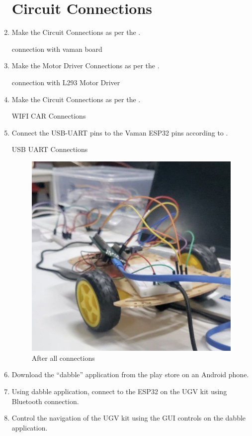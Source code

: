 \begin{enumerate}[label=\thesection.\arabic*.,ref=\thesection.\theenumi]
\section{Circuit Connections}
\item  Make the Circuit Connections as per the  .
\begin{table}[h]
\centering
	
	\caption{connection with vaman board }
	\label{Tab:connections}
\end{table}
\item Make the Motor Driver Connections as per the
.
\begin{table}[h]
\centering
	
	\caption{connection with L293 Motor Driver }
	\label{Tab:connections2}
\end{table}
\item Make the Circuit Connections as per the .
\begin{table}[h]
\centering
	
	\caption{WIFI CAR Connections}
	\label{Tab:connections3}
\end{table}
\item Connect the USB-UART pins to the Vaman ESP32 pins according to .
\begin{table}[h]
\centering
	
	\caption{USB UART Connections}
	\label{Tab:connections4}
\end{table}



\begin{figure}[H]
\centering
\includegraphics[width=0.3\columnwidth]{figs/8.jpg}
\caption{After all connections}
\end{figure}
\item Download the “dabble” application from the play store on an Android phone.
\item Using dabble application, connect to the ESP32 on the UGV kit using Bluetooth connection.
\item Control the navigation of the UGV kit using the GUI controls on the dabble application. 










\end{enumerate}
